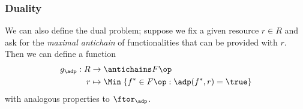 %
%




\subsubsection{Duality}


We can also define the dual problem; suppose we fix a given resource $r \in R$ and ask for the \emph{maximal antichain} of functionalities that can be provided with $r$. Then we can define a function
\begin{equation}
    \begin{aligned}
        g_\adp : R &\to \antichains F\op \\
        r &\mapsto \Min \; \{ f^* \in F\op : \adp(f^*, r) = \true \}
    \end{aligned}
\end{equation}
with analogous properties to $\ftor_\adp$.
